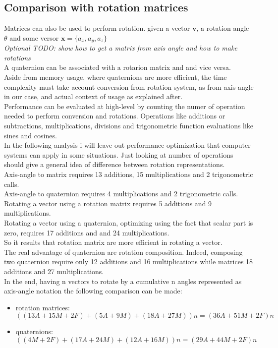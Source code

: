 \subsection{Comparison with rotation matrices}
Matrices can also be used to perform rotation. \cite{} given a vector $\boldsymbol{v}$, a rotation angle $\theta$ and some versor $\boldsymbol{x}=\{a_x, a_y, a_z\}$  \\
\textit{Optional TODO: show how to get a matrix from axis angle and how to make rotations} \\
A quaternion can be associated with a rotarion matrix and and vice versa. \cite{amslaurea6701,Eberly2016RotationRA} \\
Aside from memory usage, where quaternions are more efficient, the time complexity must take account conversion from rotation system, as from axis-angle in our case, and actual context of usage as explained after.  \\
Performance can be evaluated at high-level by counting the numer of operation needed to perform conversion and rotations. Operations like additions or subtractions, multiplications, divisions and trigonometric function evaluations like sines and cosines. \\
In the following analysis i will leave out performance optimization that computer systems can apply in some situations. Just looking at number of operations should give a general idea of difference between rotation representations. \\
Axis-angle to matrix requires 13 additions, 15 multiplications and 2 trigonometric calls. \\
Axis-angle to quaternion requires 4 multiplications and 2 trigonometric calls. \\
Rotating a vector using a rotation matrix requires 5 additions and 9 multiplications. \\
Rotating a vector using a quaternion, optimizing using the fact that scalar part is zero, requires 17 additions and and 24 multiplications. \\
So it results that rotation matrix are more efficient in rotating a vector. \\
The real advantage of quaternion are rotation composition. 
Indeed, composing two quaternion require only 12 additions and 16 multiplications while matrices 18 additions and 27 multiplications. \\
In the end, having n vectors to rotate by a cumulative n angles represented as axis-angle notation the following comparison can be made:
\begin{itemize}
\item rotation matrices: ${((13A + 15M + 2F) + (5A + 9M) + (18A + 27M))n} = {(36A + 51M + 2F)n}$
\item quaternions: ${((4M + 2F) + (17A + 24M) + (12A + 16M))n} = {(29A + 44M + 2F)n}$
\end{itemize}


